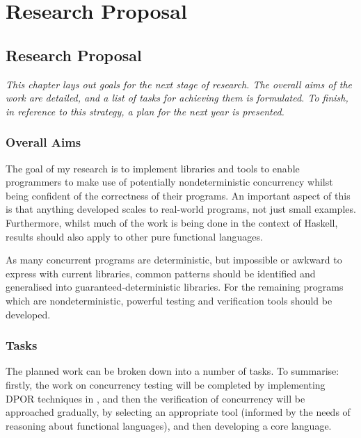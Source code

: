 \part{Research Proposal}


\chapter{Research Proposal}
\label{chp:proposal}

\textit{This chapter lays out goals for the next stage of
  research. The overall aims of the work are detailed, and a list of
  tasks for achieving them is formulated. To finish, in reference to
  this strategy, a plan for the next year is presented.}

\section{Overall Aims}
\label{sec:proposal-goals}

The goal of my research is to implement libraries and tools to enable
programmers to make use of potentially nondeterministic concurrency
whilst being confident of the correctness of their programs. An
important aspect of this is that anything developed scales to
real-world programs, not just small examples. Furthermore, whilst much
of the work is being done in the context of Haskell, results should
also apply to other pure functional languages.

As many concurrent programs are deterministic, but impossible or
awkward to express with current libraries, common patterns should be
identified and generalised into guaranteed-deterministic
libraries. For the remaining programs which are nondeterministic,
powerful testing and verification tools should be developed.

\section{Tasks}
\label{sec:proposal-tasks}

The planned work can be broken down into a number of tasks. To
summarise: firstly, the work on concurrency testing will be completed
by implementing DPOR techniques in \dejafu{}, and then the
verification of concurrency will be approached gradually, by selecting
an appropriate tool (informed by the needs of reasoning about
functional languages), and then developing a core language.

